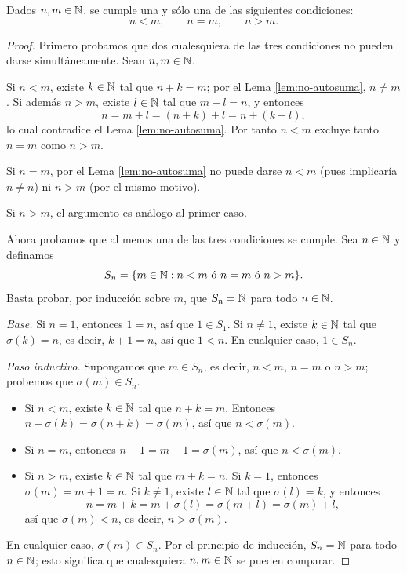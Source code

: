 \documentclass[12pt,a4paper]{book}
\begin{document}
    \begin{teorema}[Tricotomía de $\N$]
        \label{thm:tricotomia}
        Dados $n,m\in\mathbb{N}$, se cumple una y sólo una de las siguientes condiciones:
        \begin{equation*}
            n<m, \qquad n=m, \qquad n>m.
        \end{equation*}
    \end{teorema}
    \begin{proof}
        Primero probamos que dos cualesquiera de las tres condiciones no pueden darse simultáneamente. Sean $n,m\in\mathbb{N}$.

        Si $n<m$, existe $k\in\mathbb{N}$ tal que $n+k=m$; por el Lema \ref{lem:no-autosuma}, $n\neq m$. Si además $n>m$, existe $l\in\mathbb{N}$ tal que $m+l=n$, y entonces
        \begin{equation*}
            n = m+l = (n+k)+l = n+(k+l),
        \end{equation*}
        lo cual contradice el Lema \ref{lem:no-autosuma}. Por tanto $n<m$ excluye tanto $n=m$ como $n>m$.

        Si $n=m$, por el Lema \ref{lem:no-autosuma} no puede darse $n<m$ (pues implicaría $n\neq n$) ni $n>m$ (por el mismo motivo).

        Si $n>m$, el argumento es análogo al primer caso.

        Ahora probamos que al menos una de las tres condiciones se cumple. Sea $n\in\mathbb{N}$ y definamos
        \begin{equation*}
            S_n = \{m\in\mathbb{N} : n<m \text{ ó } n=m \text{ ó } n>m\}.
        \end{equation*}
        Basta probar, por inducción sobre $m$, que $S_n=\mathbb{N}$ para todo $n\in\mathbb{N}$.

        \emph{Base.} Si $n=1$, entonces $1=n$, así que $1\in S_1$. Si $n\neq1$, existe $k\in\mathbb{N}$ tal que $\sigma(k)=n$, es decir, $k+1=n$, así que $1<n$. En cualquier caso, $1\in S_n$.

        \emph{Paso inductivo.} Supongamos que $m\in S_n$, es decir, $n<m$, $n=m$ o $n>m$; probemos que $\sigma(m)\in S_n$.
        \begin{itemize}
            \item Si $n<m$, existe $k\in\mathbb{N}$ tal que $n+k=m$. Entonces $n+\sigma(k)=\sigma(n+k)=\sigma(m)$, así que $n<\sigma(m)$.
            \item Si $n=m$, entonces $n+1=m+1=\sigma(m)$, así que $n<\sigma(m)$.
            \item Si $n>m$, existe $k\in\mathbb{N}$ tal que $m+k=n$. Si $k=1$, entonces $\sigma(m)=m+1=n$. Si $k\neq1$, existe $l\in\mathbb{N}$ tal que $\sigma(l)=k$, y entonces
            \begin{equation*}
                n = m+k = m+\sigma(l) = \sigma(m+l) = \sigma(m)+l,
            \end{equation*}
            así que $\sigma(m)<n$, es decir, $n>\sigma(m)$.
        \end{itemize}
        En cualquier caso, $\sigma(m)\in S_n$. Por el principio de inducción, $S_n=\mathbb{N}$ para todo $n\in\mathbb{N}$; esto significa que cualesquiera $n,m\in\mathbb{N}$ se pueden comparar.
    \end{proof}
\end{document}

